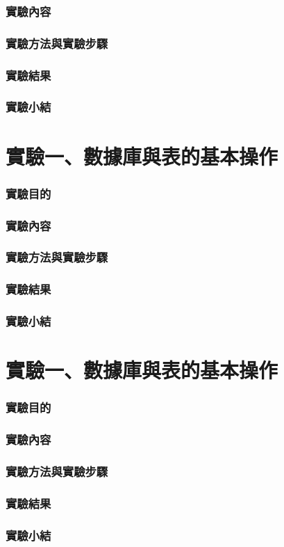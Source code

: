 \documentclass[12pt, a4paper]{report}
\begin{document}
\section{實驗內容}

\section{實驗方法與實驗步驟}

\section{實驗結果}

\section{實驗小結}

\part{實驗一、數據庫與表的基本操作}

\section{實驗目的}



\section{實驗內容}

\section{實驗方法與實驗步驟}

\section{實驗結果}

\section{實驗小結}

\part{實驗一、數據庫與表的基本操作}

\section{實驗目的}



\section{實驗內容}

\section{實驗方法與實驗步驟}

\section{實驗結果}

\section{實驗小結}
\end{document}
